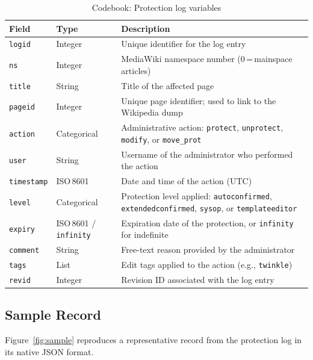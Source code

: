 \documentclass[11pt]{article}
\begin{document}
\begin{table}[ht]
\centering
\small
\singlespacing
\caption{Codebook: Protection log variables}
\label{tab:codebook}
\renewcommand{\arraystretch}{1.2}
\begin{tabular}{p{2.4cm} p{2cm} p{7.5cm}}
\toprule
\textbf{Field} & \textbf{Type} & \textbf{Description} \\
\midrule
\texttt{logid}      & Integer   & Unique identifier for the log entry \\
\texttt{ns}         & Integer   & MediaWiki namespace number (0\,=\,mainspace articles) \\
\texttt{title}      & String    & Title of the affected page \\
\texttt{pageid}     & Integer   & Unique page identifier; used to link to the Wikipedia dump \\
\texttt{action}     & Categorical & Administrative action: \texttt{protect}, \texttt{unprotect}, \texttt{modify}, or \texttt{move\_prot} \\
\texttt{user}       & String    & Username of the administrator who performed the action \\
\texttt{timestamp}  & ISO\,8601 & Date and time of the action (UTC) \\
\texttt{level}      & Categorical & Protection level applied: \texttt{autoconfirmed}, \texttt{extendedconfirmed}, \texttt{sysop}, or \texttt{templateeditor} \\
\texttt{expiry}     & ISO\,8601 / \texttt{infinity} & Expiration date of the protection, or \texttt{infinity} for indefinite \\
\texttt{comment}    & String    & Free-text reason provided by the administrator \\
\texttt{tags}       & List      & Edit tags applied to the action (e.g., \texttt{twinkle}) \\
\texttt{revid}      & Integer   & Revision ID associated with the log entry \\
\bottomrule
\end{tabular}
\end{table}

\subsection{Sample Record}

Figure~\ref{fig:sample} reproduces a representative record from the protection log in its native JSON format.
\end{document}
